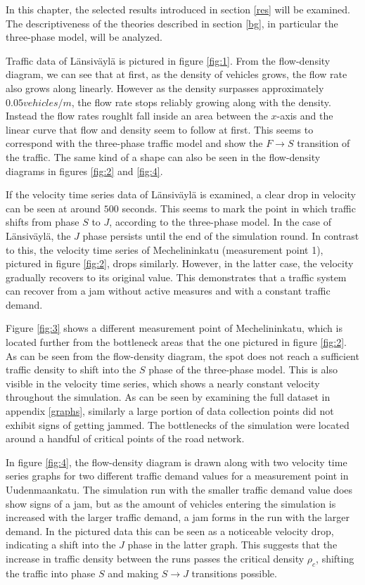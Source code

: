 \documentclass[english, 12pt, a4paper, elec, utf8, pdfa, online]{aaltothesis}
\begin{document}
In this chapter, the selected results introduced in section \ref{res} will be examined. The descriptiveness of the theories described in section \ref{bg}, in particular the three-phase model, will be analyzed.

Traffic data of Länsiväylä is pictured in figure \ref{fig:1}. From the flow-density diagram, we can see that at first, as the density of vehicles grows, the flow rate also grows along linearly. However as the density surpasses approximately $0.05 vehicles/m$, the flow rate stops reliably growing along with the density. Instead the flow rates roughlt fall inside an area between the $x$-axis and the linear curve that flow and density seem to follow at first. This seems to correspond with the three-phase traffic model and show the $F \to S$ transition of the traffic. The same kind of a shape can also be seen in the flow-density diagrams in figures \ref{fig:2} and \ref{fig:4}.

If the velocity time series data of Länsiväylä is examined, a clear drop in velocity can be seen at around $500$ seconds. This seems to mark the point in which traffic shifts from phase $S$ to $J$, according to the three-phase model. In the case of Länsiväylä, the $J$ phase persists until the end of the simulation round. In contrast to this, the velocity time series of Mechelininkatu (measurement point 1), pictured in figure \ref{fig:2}, drops similarly. However, in the latter case, the velocity gradually recovers to its original value. This demonstrates that a traffic system can recover from a jam without active measures and with a constant traffic demand.

Figure \ref{fig:3} shows a different measurement point of Mechelininkatu, which is located further from the bottleneck areas that the one pictured in figure \ref{fig:2}. As can be seen from the flow-density diagram, the spot does not reach a sufficient traffic density to shift into the $S$ phase of the three-phase model. This is also visible in the velocity time series, which shows a nearly constant velocity throughout the simulation. As can be seen by examining the full dataset in appendix \ref{graphs}, similarly a large portion of data collection points did not exhibit signs of getting jammed. The bottlenecks of the simulation were located around a handful of critical points of the road network.

In figure \ref{fig:4}, the flow-density diagram is drawn along with two velocity time series graphs for two different traffic demand values for a measurement point in Uudenmaankatu. The simulation run with the smaller traffic demand value does show signs of a jam, but as the amount of vehicles entering the simulation is increased with the larger traffic demand, a jam forms in the run with the larger demand. In the pictured data this can be seen as a noticeable velocity drop, indicating a shift into the $J$ phase in the latter graph. This suggests that the increase in traffic density between the runs passes the critical density $\rho_c$, shifting the traffic into phase $S$ and making $S \to J$ transitions possible.
\end{document}
